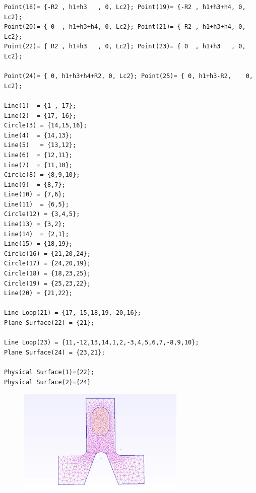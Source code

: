 \documentclass[12pt]{article}
\begin{document}
\begin{CJK}{UTF8}{gkai}
\begin{verbatim}
Point(18)= {-R2 , h1+h3   , 0, Lc2}; Point(19)= {-R2 , h1+h3+h4, 0, Lc2};
Point(20)= { 0  , h1+h3+h4, 0, Lc2}; Point(21)= { R2 , h1+h3+h4, 0, Lc2};
Point(22)= { R2 , h1+h3   , 0, Lc2}; Point(23)= { 0  , h1+h3   , 0, Lc2};

Point(24)= { 0, h1+h3+h4+R2, 0, Lc2}; Point(25)= { 0, h1+h3-R2,    0, Lc2};

Line(1)  = {1 , 17};
Line(2)  = {17, 16};
Circle(3) = {14,15,16};
Line(4)  = {14,13};
Line(5)   = {13,12}; 
Line(6)  = {12,11};
Line(7)  = {11,10}; 
Circle(8) = {8,9,10}; 
Line(9)  = {8,7};
Line(10) = {7,6};   
Line(11)  = {6,5};    
Circle(12) = {3,4,5};
Line(13) = {3,2};   
Line(14)  = {2,1};    
Line(15) = {18,19};
Circle(16) = {21,20,24}; 
Circle(17) = {24,20,19};
Circle(18) = {18,23,25}; 
Circle(19) = {25,23,22};
Line(20) = {21,22};

Line Loop(21) = {17,-15,18,19,-20,16};
Plane Surface(22) = {21};

Line Loop(23) = {11,-12,13,14,1,2,-3,4,5,6,7,-8,9,10};
Plane Surface(24) = {23,21};

Physical Surface(1)={22};
Physical Surface(2)={24}
\end{verbatim}
\begin{figure}[H]
	\centering
	\includegraphics[width=8cm]{buming.png}
	\caption{}  		
\end{figure}

\end{CJK}
\end{document}
